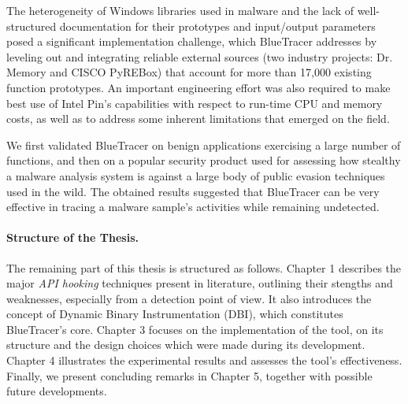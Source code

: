 The heterogeneity of Windows libraries used in malware and the lack of well-structured documentation for their prototypes and input/output parameters posed a significant implementation challenge, which BlueTracer addresses by leveling out and integrating reliable external sources (two industry projects: Dr. Memory and CISCO PyREBox) that account for more than 17,000 existing function prototypes. An important engineering effort was also required to make best use of Intel Pin’s capabilities with respect to run-time CPU and memory costs, as well as to address some inherent limitations that emerged on the field.

We first validated BlueTracer on benign applications exercising a large number of functions, and then on a popular security product used for assessing how stealthy a malware analysis system is against a large body of public evasion techniques used in the wild. The obtained results suggested that BlueTracer can be very effective in tracing a malware sample's activities while remaining undetected. 
\iffalse
I then analyzed a set of highly evasive samples collected by Joe Security, the proclaimed technology leader for the analysis of evasive malware, as they feature exotic evasions that most analysis products have struggled to deal with. The logs collected by BlueTracer reveal behaviors consistent with the analysis reports authored by Joe Security, suggesting that BlueTracer can be very effective in tracing a malware sample's activities while remaining undetected. 
\fi               

\paragraph{Structure of the Thesis.}
The remaining part of this thesis is structured as follows.
Chapter 1 describes the major \textit{API hooking} techniques present in literature, outlining their stengths and weaknesses, especially from a detection point of view. It also introduces the concept of Dynamic Binary Instrumentation (DBI), which constitutes BlueTracer's core.
Chapter 3 focuses on the implementation of the tool, on its structure and the design choices which were made during its development.
Chapter 4 illustrates the experimental results and assesses the tool's effectiveness.
Finally, we present concluding remarks in Chapter 5, together with possible future developments.

